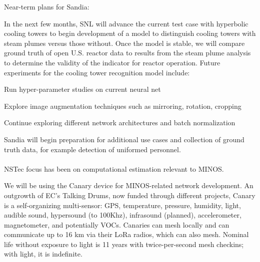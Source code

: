 \documentclass[11pt]{article} %
\begin{document}
\noindent Near-term plans for Sandia:

In the next few months, SNL will advance the current test case with hyperbolic cooling towers to begin development of a model to distinguish cooling towers with steam plumes versus those without. Once the model is stable, we will compare ground truth of open U.S. reactor data to results from the steam plume analysis to determine the validity of the indicator for reactor operation. Future experiments for the cooling tower recognition model include:
\renewcommand\labelitemi{\tiny$\bullet$}
\begin{itemize*}
\item Run hyper-parameter studies on current neural net 
\item Explore image augmentation techniques such as mirroring, rotation, cropping
\item Continue exploring different network architectures and batch normalization
\end{itemize*}
Sandia will begin preparation for additional use cases and collection of ground truth data, for example detection of uniformed personnel.\\
\\
\noindent NSTec focus has been on computational estimation relevant to MINOS. 

We will be using the Canary device for MINOS-related network development. An outgrowth of EC's Talking Drums, now funded through different projects, Canary is a self-organizing multi-sensor: GPS, temperature, pressure, humidity, light, audible sound, hypersound (to 100Khz), infrasound (planned), accelerometer, magnetometer, and potentially VOCs. Canaries can mesh locally and can communicate up to 16 km via their LoRa radios, which can also mesh. Nominal life without exposure to light is 11 years with twice-per-second mesh checkins; with light, it is indefinite. 
\end{document}
